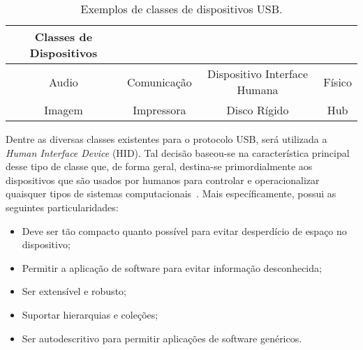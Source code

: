 \begin{table}
	\begin{center}
		\begin{tabular}{cccc}
		\hline
		\textbf{Classes de Dispositivos} \\
		\hline
		Audio & Comunicação & Dispositivo Interface Humana & Físico \\
		Imagem & Impressora & Disco Rígido & Hub \\
		\hline
		\end{tabular}
	\end{center}
	\caption{Exemplos de classes de dispositivos USB.}
	\label{tab:dispositivos_usb}
\end{table}

Dentre as diversas classes existentes para o protocolo USB, será utilizada a \emph{Human Interface Device} (HID). Tal decisão baseou-se na característica principal desse tipo de classe que, de forma geral, destina-se primordialmente aos dispositivos que são usados por humanos para controlar e operacionalizar quaisquer tipos de sistemas computacionais~\cite{hid}. Mais específicamente, possui as seguintes particularidades:

\begin{itemize}
	\item Deve ser tão compacto quanto possível para evitar desperdício de espaço no dispositivo;
	\item Permitir a aplicação de software para evitar informação desconhecida;
	\item Ser extensível e robusto;
	\item Suportar hierarquias e coleções;
	\item Ser autodescritivo para permitir aplicações de software genéricos.
\end{itemize}

